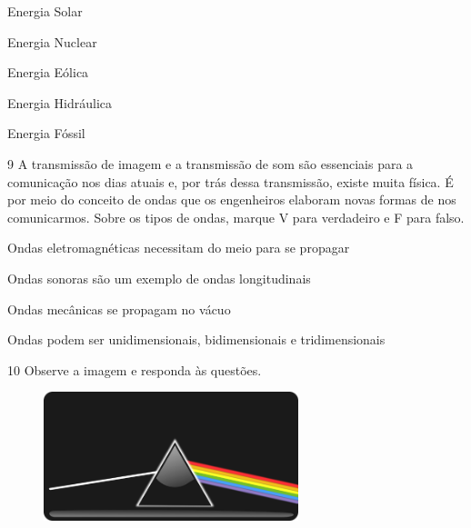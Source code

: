 {\begin{boxlist}
\item Energia Solar 

\item Energia Nuclear

\item Energia Eólica 

\item Energia Hidráulica 

\item Energia Fóssil
\end{boxlist}


\num{9} A transmissão de imagem e a transmissão de som são essenciais para a comunicação nos
  dias atuais e, por trás dessa transmissão, existe muita física. É
  por meio do conceito de ondas que os engenheiros elaboram novas formas
  de nos comunicarmos. Sobre os tipos de ondas, marque V para verdadeiro e F para falso.

\begin{boxlist}
\item Ondas eletromagnéticas necessitam do meio para se propagar 

\item Ondas sonoras são um exemplo de ondas longitudinais 

\item Ondas mecânicas se propagam no vácuo 

\item Ondas podem ser unidimensionais, bidimensionais e tridimensionais 
\end{boxlist}

\num{10} Observe a imagem e responda às questões.

\begin{figure}[htpb!]
\includegraphics[width=2.91389in,height=1.47847in]{./imgs/img8.png}
\end{figure}

}
